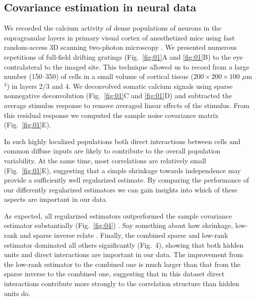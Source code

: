 \documentclass[10pt]{article}
\newcommand{\Acomment}[1]{{\color{red}{[AE: #1]}}}
\begin{document}
\subsection*{Covariance estimation in neural data}


We recorded the calcium activity of dense populations of neurons in the supragranular layers in primary visual cortex of anesthetized mice using fast random-access 3D scanning two-photon microscopy \cite{Stosiek:2003,Reddy:2005}. We presented numerous repetitions of full-field drifting gratings (Fig.~\ref{fig:01}A and \ref{fig:01}B) to the eye contralateral to the imaged site. This technique allowed us to record from a large number (150--350) of cells in a small volume of cortical tissue ($200\times200\times100$ $\mu$m$^3$) in layers 2/3 and 4. We deconvolved somatic calcium signals using sparse nonnegative deconvolution \cite{Vogelstein:2010} (Fig.~\ref{fig:01}C and \ref{fig:01}D) and subtracted the average stimulus response to remove averaged linear effects of the stimulus. From this residual response we computed the sample noise covariance matrix (Fig.~\ref{fig:01}E).


In such highly localized populations both direct interactions between cells and common diffuse inputs are likely to contribute to the overall population variability. At the same time, most correlations are relatively small (Fig.~\ref{fig:01}E), suggesting that a simple shrinkage towards independence may provide a sufficiently well regularized estimate. By comparing the performance of our differently regularized estimators we can gain insights into which of these aspects are important in our data.

As expected, all regularized estimators outperformed the sample covariance estimator substantially (Fig.~\ref{fig:04}) \Acomment{I think we should show that}. Say something about how shrinkage, low-rank and sparse inverse relate \Acomment{Why do we do pairwise comparisons instead of just showing median (across sites) log loss relative to the combined estimator? I've seen many people do this and it provides an ordering. I feel like we should come up with a way of ordering them somehow, even if it's under certain assumptions that may not be entirely correct. I'm pretty sure if we don't do it the reviewers will bring it up anyway...}. Finally, the combined sparse and low-rank estimator dominated all others significantly (Fig.~4), showing that both hidden units and direct interactions are important in our data. The improvement from the low-rank estimator to the combined one is much larger than that from the sparse inverse to the combined one, suggesting that in this dataset direct interactions contribute more strongly to the correlation structure than hidden units do.
\end{document}

